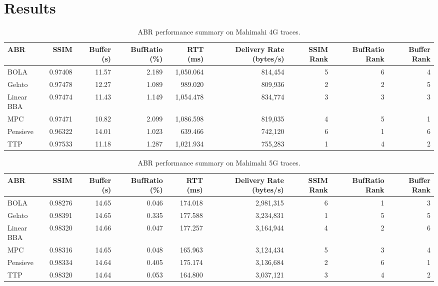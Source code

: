 \section{Results}\label{s:evaluation}

\begin{table}[htbp]
\centering
\small
\caption{ABR performance summary on Mahimahi 4G traces.}
\label{tab:abr_results_4g}
\begin{tabular}{@{\hskip 4pt}l@{\hskip 6pt}r@{\hskip 6pt}r@{\hskip 6pt}r@{\hskip 6pt}r@{\hskip 6pt}r@{\hskip 6pt}r@{\hskip 6pt}r@{\hskip 6pt}r@{\hskip 4pt}}
\toprule
\textbf{ABR} & \textbf{SSIM} & \textbf{Buffer (s)} & \textbf{BufRatio (\%)} & \textbf{RTT (ms)} & \textbf{Delivery Rate (bytes/s)} & \textbf{SSIM Rank} & \textbf{BufRatio Rank} & \textbf{Buffer Rank} \\
\midrule
BOLA      & 0.97408 & 11.57 & 2.189 & 1{,}050.064 & 814{,}454   & 5 & 6 & 4 \\
Gelato    & 0.97478 & 12.27 &  1.089 &   989.020 & 809{,}936   & 2 & 2 & 5 \\
Linear BBA    & 0.97474 & 11.43 &  1.149 & 1{,}054.478 & 834{,}774   & 3 & 3 & 3 \\
MPC       & 0.97471 & 10.82 & 2.099 & 1{,}086.598 & 819{,}035   & 4 & 5 & 1 \\
Pensieve  & 0.96322 & 14.01 &  1.023 &   639.466 & 742{,}120   & 6 & 1 & 6 \\
TTP       & 0.97533 & 11.18 &  1.287 & 1{,}021.934 & 755{,}283   & 1 & 4 & 2 \\
\bottomrule
\end{tabular}
\end{table}

\begin{table}[htbp]
\centering
\small
\caption{ABR performance summary on Mahimahi 5G traces.}
\label{tab:abr_results_mahimahi5g}
\begin{tabular}{@{\hskip 4pt}l@{\hskip 6pt}r@{\hskip 6pt}r@{\hskip 6pt}r@{\hskip 6pt}r@{\hskip 6pt}r@{\hskip 6pt}r@{\hskip 6pt}r@{\hskip 6pt}r@{\hskip 4pt}}
\toprule
\textbf{ABR} & \textbf{SSIM} & \textbf{Buffer (s)} & \textbf{BufRatio (\%)} & \textbf{RTT (ms)} & \textbf{Delivery Rate (bytes/s)} & \textbf{SSIM Rank} & \textbf{BufRatio Rank} & \textbf{Buffer Rank} \\
\midrule
BOLA      & 0.98276 & 14.65 & 0.046 & 174.018 & 2{,}981{,}315 & 6 & 1 & 3 \\
Gelato    & 0.98391 & 14.65 & 0.335 & 177.588 & 3{,}234{,}831 & 1 & 5 & 5 \\
Linear BBA    & 0.98320 & 14.66 & 0.047 & 177.257 & 3{,}164{,}944 & 4 & 2 & 6 \\
MPC       & 0.98316 & 14.65 & 0.048 & 165.963 & 3{,}124{,}434 & 5 & 3 & 4 \\
Pensieve  & 0.98334 & 14.64 & 0.405 & 175.174 & 3{,}136{,}684 & 2 & 6 & 1 \\
TTP       & 0.98320 & 14.64 & 0.053 & 164.800 & 3{,}037{,}121 & 3 & 4 & 2 \\
\bottomrule
\end{tabular}
\end{table}

